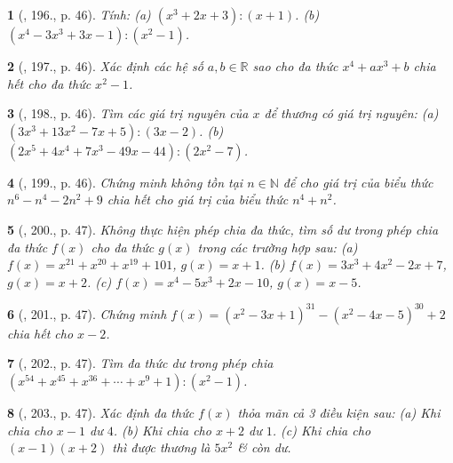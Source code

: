\documentclass{article}
\newtheorem{baitoan}{}
\begin{document}
\begin{baitoan}[\cite{Tuyen_Toan_7}, 196., p. 46]
	Tính: (a) $(x^3 + 2x + 3):(x + 1)$. (b) $(x^4 - 3x^3 + 3x - 1):(x^2 - 1)$.
\end{baitoan}

\begin{baitoan}[\cite{Tuyen_Toan_7}, 197., p. 46]
	Xác định các hệ số $a,b\in\mathbb{R}$ sao cho đa thức $x^4 + ax^3 + b$ chia hết cho đa thức $x^2 - 1$.
\end{baitoan}

\begin{baitoan}[\cite{Tuyen_Toan_7}, 198., p. 46]
	Tìm các giá trị nguyên của $x$ để thương có giá trị nguyên: (a) $(3x^3 + 13x^2 - 7x + 5):(3x - 2)$. (b) $(2x^5 + 4x^4 + 7x^3 - 49x - 44):(2x^2 - 7)$.
\end{baitoan}

\begin{baitoan}[\cite{Tuyen_Toan_7}, 199., p. 46]
	Chứng minh không tồn tại $n\in\mathbb{N}$ để cho giá trị của biểu thức $n^6 - n^4 - 2n^2 + 9$ chia hết cho giá trị của biểu thức $n^4 + n^2$.
\end{baitoan}

\begin{baitoan}[\cite{Tuyen_Toan_7}, 200., p. 47]
	Không thực hiện phép chia đa thức, tìm số dư trong phép chia đa thức $f(x)$ cho đa thức $g(x)$ trong các trường hợp sau: (a) $f(x) = x^{21} + x^{20} + x^{19} + 101$, $g(x) = x + 1$. (b) $f(x) = 3x^3 + 4x^2 - 2x + 7$, $g(x) = x + 2$. (c) $f(x) = x^4 - 5x^3 + 2x - 10$, $g(x) = x - 5$.
\end{baitoan}

\begin{baitoan}[\cite{Tuyen_Toan_7}, 201., p. 47]
	Chứng minh $f(x) = (x^2 - 3x + 1)^{31} - (x^2 - 4x - 5)^{30} + 2$ chia hết cho $x - 2$.
\end{baitoan}

\begin{baitoan}[\cite{Tuyen_Toan_7}, 202., p. 47]
	Tìm đa thức dư trong phép chia $(x^{54} + x^{45} + x^{36} + \cdots + x^9 + 1):(x^2 - 1)$.
\end{baitoan}

\begin{baitoan}[\cite{Tuyen_Toan_7}, 203., p. 47]
	Xác định đa thức $f(x)$ thỏa mãn cả 3 điều kiện sau: (a) Khi chia cho $x - 1$ dư $4$. (b) Khi chia cho $x + 2$ dư $1$. (c) Khi chia cho $(x - 1)(x + 2)$ thì được thương là $5x^2$ \& còn dư.
\end{baitoan}
\end{document}
